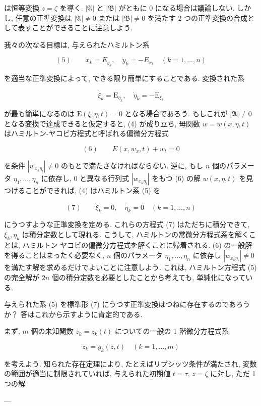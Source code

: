 \documentclass[dvipdfmx, leqno]{jsbook}
\begin{document}
は恒等変換 $z = \zeta$ を導く. $|\mathfrak{A}|$ と $|\mathfrak{B}|$ がともに $0$ になる場合は議論しない. しかし, 任意の正準変換は $|\mathfrak{A}| \neq 0$ または $|\mathfrak{B}| \neq 0$ を満たす 2 つの正準変換の合成として表すことができることに注意しよう.

我々の次なる目標は, 与えられたハミルトン系

$$(5) \qquad \dot{x}_k = E_{y_k}, \quad \dot{y}_k = -E_{x_k} \quad (k=1,\dots,n)$$

を適当な正準変換によって, できる限り簡単にすることである. 変換された系

$$\dot{\xi}_k = \mathrm{E}_{\eta_k}, \quad \dot{\eta}_k = -\mathrm{E}_{\xi_k}$$

が最も簡単になるのは $\mathrm{E}(\xi, \eta, t) = 0$ となる場合であろう. もしこれが $|\mathfrak{A}| \neq 0$ となる変換で達成できると仮定すると, (4) が成り立ち, 母関数 $w = w(x, \eta, t)$ はハミルトン-ヤコビ方程式と呼ばれる偏微分方程式

$$(6) \qquad E(x, w_x, t) + w_t = 0$$

を条件 $|w_{x_k \eta_l}| \neq 0$ のもとで満たさなければならない. 逆に, もし $n$ 個のパラメータ $\eta_1, \dots, \eta_n$ に依存し, $0$ と異なる行列式 $|w_{x_k \eta_l}|$ をもつ (6) の解 $w(x, \eta, t)$ を見つけることができれば, (4) はハミルトン系 (5) を

$$(7) \qquad \dot{\xi}_k = 0, \quad \dot{\eta}_k = 0 \quad (k=1,\dots,n)$$

にうつすような正準変換を定める. これらの方程式 (7) はただちに積分できて, $\xi_k, \eta_k$ は積分定数として現れる. こうして, ハミルトンの常微分方程式系を解くことは, ハミルトン-ヤコビの偏微分方程式を解くことに帰着される. (6) の一般解を得ることはまったく必要なく, $n$ 個のパラメータ $\eta_1, \dots, \eta_n$ に依存し $|w_{x_k \eta_l}| \neq 0$ を満たす解を求めるだけでよいことに注意しよう. これは, ハミルトン方程式 (5) の完全解が $2n$ 個の積分定数を必要としたことから考えても, 単純化になっている.

与えられた系 (5) を標準形 (7) にうつす正準変換はつねに存在するのであろうか？ 答はこれから示すように肯定的である.

まず, $m$ 個の未知関数 $z_k = z_k(t)$ についての一般の 1 階微分方程式系

$$\dot{z}_k = g_k(z, t) \quad (k=1,\dots,m)$$

を考えよう. 知られた存在定理により, たとえばリプシッツ条件が満たされ, 変数の範囲が適当に制限されていれば, 与えられた初期値 $t = \tau, \, z = \zeta$ に対し, ただ 1 つの解

---
\end{document}
